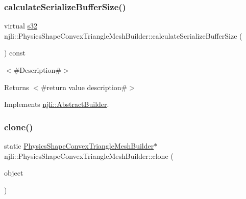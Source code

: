 \mbox{\label{classnjli_1_1_physics_shape_convex_triangle_mesh_builder_a4fcf9f8e56c67482a47f7cc5e8011cce}} 
\subsubsection{\texorpdfstring{calculate\+Serialize\+Buffer\+Size()}{calculateSerializeBufferSize()}}
{\footnotesize\ttfamily virtual \mbox{\hyperlink{_util_8h_aa62c75d314a0d1f37f79c4b73b2292e2}{s32}} njli\+::\+Physics\+Shape\+Convex\+Triangle\+Mesh\+Builder\+::calculate\+Serialize\+Buffer\+Size (\begin{DoxyParamCaption}{ }\end{DoxyParamCaption}) const\hspace{0.3cm}{\ttfamily [virtual]}}

$<$\#\+Description\#$>$

\begin{DoxyReturn}{Returns}
$<$\#return value description\#$>$ 
\end{DoxyReturn}


Implements \mbox{\hyperlink{classnjli_1_1_abstract_builder_aa1d220053e182c37b31b427499c6eacf}{njli\+::\+Abstract\+Builder}}.

\mbox{\label{classnjli_1_1_physics_shape_convex_triangle_mesh_builder_a2d54c76e2d2f68dc21107049d8977aec}} 
\subsubsection{\texorpdfstring{clone()}{clone()}}
{\footnotesize\ttfamily static \mbox{\hyperlink{classnjli_1_1_physics_shape_convex_triangle_mesh_builder}{Physics\+Shape\+Convex\+Triangle\+Mesh\+Builder}}$\ast$ njli\+::\+Physics\+Shape\+Convex\+Triangle\+Mesh\+Builder\+::clone (\begin{DoxyParamCaption}\item[{const \mbox{\hyperlink{classnjli_1_1_physics_shape_convex_triangle_mesh_builder}{Physics\+Shape\+Convex\+Triangle\+Mesh\+Builder}} \&}]{object }\end{DoxyParamCaption})\hspace{0.3cm}{\ttfamily [static]}}

